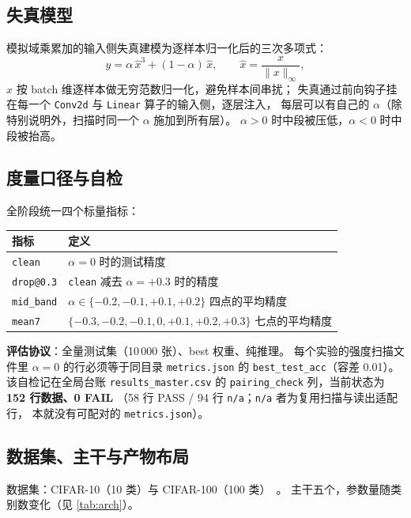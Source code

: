 \documentclass[11pt,a4paper]{ctexart}
\begin{document}
\subsection{失真模型}

模拟域乘累加的输入侧失真建模为逐样本归一化后的三次多项式：
\begin{equation}
y = \alpha\,\hat{x}^3 + (1-\alpha)\,\hat{x},
\qquad
\hat{x} = \frac{x}{\|x\|_\infty},
\label{eq:distortion}
\end{equation}
$\hat{x}$ 按 batch 维逐样本做无穷范数归一化，避免样本间串扰；
失真通过前向钩子挂在每一个 \texttt{Conv2d} 与 \texttt{Linear} 算子的输入侧，逐层注入，
每层可以有自己的 $\alpha$（除特别说明外，扫描时同一个 $\alpha$ 施加到所有层）。
$\alpha>0$ 时中段被压低，$\alpha<0$ 时中段被抬高。

\subsection{度量口径与自检}

全阶段统一四个标量指标：

\begin{center}
\small
\begin{tabular}{ll}
\toprule
指标 & 定义 \\
\midrule
\texttt{clean} & $\alpha=0$ 时的测试精度 \\
\texttt{drop@0.3} & \texttt{clean} 减去 $\alpha=+0.3$ 时的精度 \\
\texttt{mid\_band} & $\alpha\in\{-0.2,-0.1,+0.1,+0.2\}$ 四点的平均精度 \\
\texttt{mean7} & $\{-0.3,-0.2,-0.1,0,+0.1,+0.2,+0.3\}$ 七点的平均精度 \\
\bottomrule
\end{tabular}
\end{center}

\textbf{评估协议}：全量测试集（10\,000 张）、best 权重、纯推理。
每个实验的强度扫描文件里 $\alpha=0$ 的行必须等于同目录 \texttt{metrics.json} 的
\texttt{best\_test\_acc}（容差 0.01）。该自检记在全局台账 \texttt{results\_master.csv} 的
\texttt{pairing\_check} 列，当前状态为 \textbf{152 行数据、0 FAIL}
（58 行 PASS / 94 行 \texttt{n/a}；\texttt{n/a} 者为复用扫描与读出适配行，
本就没有可配对的 \texttt{metrics.json}）。

\subsection{数据集、主干与产物布局}

数据集：CIFAR-10（10 类）与 CIFAR-100（100 类）~\cite{cifar}。
主干五个，参数量随类别数变化（见 \cref{tab:arch}）。
\end{document}
